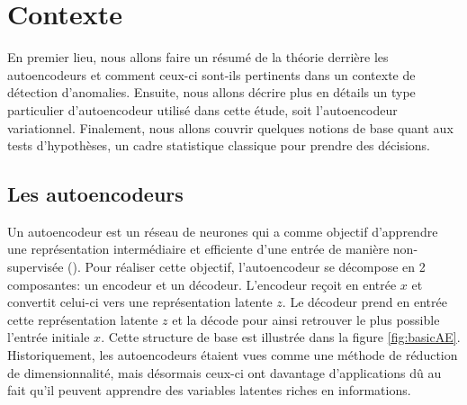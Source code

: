 \chapter{Contexte}     %
\label{chap:background}                   %

En premier lieu, nous allons faire un résumé de la théorie derrière les autoencodeurs et comment ceux-ci sont-ils pertinents dans un contexte de détection d'anomalies. Ensuite, nous allons décrire plus en détails un type particulier d'autoencodeur utilisé dans cette étude, soit l'autoencodeur variationnel. Finalement, nous allons couvrir quelques notions de base quant aux tests d'hypothèses, un cadre statistique classique pour prendre des décisions.

\section{Les autoencodeurs}

Un autoencodeur est un réseau de neurones qui a comme objectif d'apprendre une représentation intermédiaire et efficiente d'une entrée de manière non-supervisée (\cite{Goodfellow-et-al-2016}). Pour réaliser cette objectif, l'autoencodeur se décompose en 2 composantes: un encodeur et un décodeur. L'encodeur reçoit en entrée $x$ et convertit celui-ci vers une représentation latente $z$. Le décodeur prend en entrée cette représentation latente $z$ et la décode pour ainsi retrouver le plus possible l'entrée initiale $x$. Cette structure de base est illustrée dans la figure \ref{fig:basicAE}. Historiquement, les autoencodeurs étaient vues comme une méthode de réduction de dimensionnalité, mais désormais ceux-ci ont davantage d'applications dû au fait qu'il peuvent apprendre des variables latentes riches en informations. \newline

